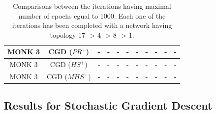 \begin{table}[H]
\begin{subtable}{\textwidth}
{\begin{tabular}{| c | c | c | c | c | c | c | c | c | c | c |}
                            MONK 3 & CGD ($PR^{+}$) & - & - & - & - & - & - & - & - & - \\
                            \hline
                            MONK 3 & CGD ($HS^{+}$) & - & - & - & - & - & - & - & - & - \\
                            \hline
                            MONK 3 & CGD ($MHS^{+}$) & - & - & - & - & - & - & - & - & - \\
                            \hline
                        \end{tabular}
                    }
                \end{subtable}
                \caption{Comparisons between the iterations having maximal number of epochs egual to 1000.
                Each one of the iterations has been completed with a network having topology
                17 -> 4 -> 8 -> 1.}
                \label{tab:monks_max_epochs}
            \end{table}


        \subsection{Results for Stochastic Gradient Descent} %
        \label{sub:results_for_stochastic_gradient_descent}

